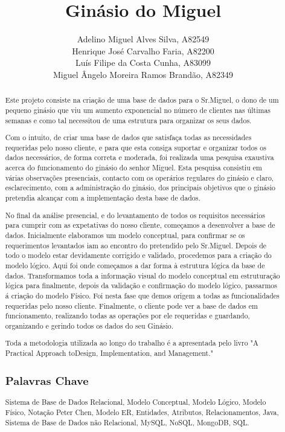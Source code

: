 \documentclass[a4paper, twoside]{report}
\title{Ginásio do Miguel}
\author{Adelino Miguel Alves Silva, A82549\\
        Henrique José Carvalho Faria, A82200\\
        Luís Filipe da Costa Cunha, A83099\\
        Miguel Ângelo Moreira Ramos Brandão, A82349}
\begin{document}


\renewcommand{\abstractname}{Resumo}

\begin{abstract}
Este projeto consiste na criação de uma base de dados para o Sr.Miguel, o dono de um pequeno ginásio que viu um aumento exponencial no número de clientes nas últimas semanas e como tal necessitou de uma estrutura para  organizar os seus dados.\par
Com o intuito, de criar uma base de dados que satisfaça todas as necessidades requeridas pelo nosso cliente, e para que esta consiga suportar e organizar todos os dados necessários, de forma correta e moderada, foi realizada uma pesquisa exaustiva acerca do funcionamento do ginásio do senhor Miguel. Esta pesquisa consistiu em várias observações presenciais, contacto com os operários regulares do ginásio e claro, esclarecimento, com a administração do ginásio, dos principais objetivos que o ginásio pretendia alcançar com a implementação desta base de dados.\par
No final da análise presencial, e do levantamento de todos os requisitos necessários para cumprir com as expetativas do nosso cliente, começamos a desenvolver a base de dados. Inicialmente elaboramos um modelo conceptual, para confirmar se os requerimentos levantados iam ao encontro do pretendido pelo Sr.Miguel. Depois de todo o modelo estar devidamente corrigido e validado, procedemos  para a criação do modelo lógico. Aqui foi onde começamos a dar forma à estrutura lógica da base de dados. Transformamos toda a informação visual do modelo conceptual em estruturação lógica para finalmente, depois da validação e confirmação do modelo lógico, passarmos á criação do modelo Físico. Foi nesta fase que demos origem a todas as funcionalidades requeridas pelo nosso cliente. Finalmente, o cliente pode ver a base de dados em funcionamento, realizando todas as operações por ele requeridas e guardando, organizando e gerindo todos os dados do seu Ginásio.

\par Toda a metodologia utilizada ao longo do trabalho é a apresentada pelo livro "A Practical Approach toDesign, Implementation, and Management."  \cite{dbsys} 

\subsection*{Palavras Chave}
Sistema de Base de Dados Relacional, Modelo Conceptual, Modelo Lógico, Modelo Físico, Notação Peter Chen, Modelo ER, Entidades, Atributos, Relacionamentos, Java, Sistema de Base de Dados não Relacional, MySQL, NoSQL, MongoDB, SQL.

\end{abstract}
\end{document}

